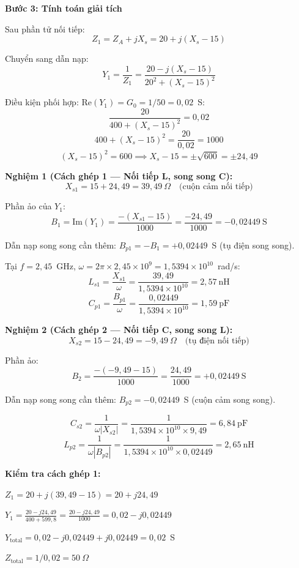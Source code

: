 \documentclass[12pt,a4paper]{article}
\begin{document}
\textbf{Bước 3: Tính toán giải tích}

Sau phần tử nối tiếp:
\[
Z_1 = Z_A + jX_s = 20 + j(X_s - 15)
\]

Chuyển sang dẫn nạp:
\[
Y_1 = \frac{1}{Z_1} = \frac{20 - j(X_s - 15)}{20^2 + (X_s - 15)^2}
\]

Điều kiện phối hợp: $\text{Re}(Y_1) = G_0 = 1/50 = 0{,}02$~S:
\[
\frac{20}{400 + (X_s - 15)^2} = 0{,}02
\]
\[
400 + (X_s - 15)^2 = \frac{20}{0{,}02} = 1000
\]
\[
(X_s - 15)^2 = 600 \implies X_s - 15 = \pm\sqrt{600} = \pm 24{,}49
\]

\textbf{Nghiệm 1 (Cách ghép 1 --- Nối tiếp L, song song C):}
\[
X_{s1} = 15 + 24{,}49 = 39{,}49~\Omega \quad \text{(cuộn cảm nối tiếp)}
\]

Phần ảo của $Y_1$:
\[
B_1 = \text{Im}(Y_1) = \frac{-(X_{s1} - 15)}{1000} = \frac{-24{,}49}{1000} = -0{,}02449~\text{S}
\]

Dẫn nạp song song cần thêm: $B_{p1} = -B_1 = +0{,}02449$~S (tụ điện song song).

Tại $f = 2{,}45$~GHz, $\omega = 2\pi \times 2{,}45 \times 10^9 = 1{,}5394 \times 10^{10}$~rad/s:
\[
\boxed{L_{s1} = \frac{X_{s1}}{\omega} = \frac{39{,}49}{1{,}5394 \times 10^{10}} = 2{,}57~\text{nH}}
\]
\[
\boxed{C_{p1} = \frac{B_{p1}}{\omega} = \frac{0{,}02449}{1{,}5394 \times 10^{10}} = 1{,}59~\text{pF}}
\]

\textbf{Nghiệm 2 (Cách ghép 2 --- Nối tiếp C, song song L):}
\[
X_{s2} = 15 - 24{,}49 = -9{,}49~\Omega \quad \text{(tụ điện nối tiếp)}
\]

Phần ảo:
\[
B_2 = \frac{-(-9{,}49 - 15)}{1000} = \frac{24{,}49}{1000} = +0{,}02449~\text{S}
\]

Dẫn nạp song song cần thêm: $B_{p2} = -0{,}02449$~S (cuộn cảm song song).

\[
\boxed{C_{s2} = \frac{1}{\omega |X_{s2}|} = \frac{1}{1{,}5394 \times 10^{10} \times 9{,}49} = 6{,}84~\text{pF}}
\]
\[
\boxed{L_{p2} = \frac{1}{\omega |B_{p2}|} = \frac{1}{1{,}5394 \times 10^{10} \times 0{,}02449} = 2{,}65~\text{nH}}
\]

\textbf{Kiểm tra cách ghép 1:}

$Z_1 = 20 + j(39{,}49 - 15) = 20 + j24{,}49$

$Y_1 = \frac{20 - j24{,}49}{400 + 599{,}8} = \frac{20 - j24{,}49}{1000} = 0{,}02 - j0{,}02449$

$Y_{\text{total}} = 0{,}02 - j0{,}02449 + j0{,}02449 = 0{,}02$~S

$Z_{\text{total}} = 1/0{,}02 = 50~\Omega$ \checkmark
\end{document}
